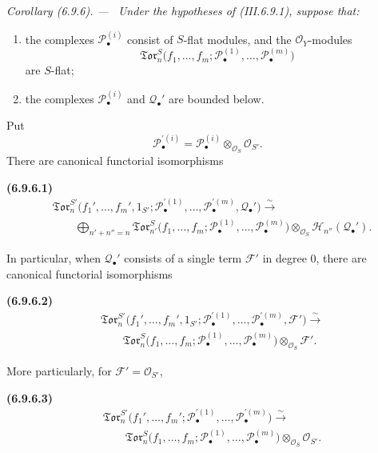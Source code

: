 \documentclass[10pt,oneside]{book}
\newcommand{\sh}[1]{\mathscr{#1}}
\newcommand{\sref}[2][]{(#2)}
\newcommand{\oldpage}[2][]{\setcounter{footnote}{0}\marginpar{\scriptsize\textbf{#1}~|~#2}\ignorespaces}
\newenvironment{env}[1][]{\par\medskip\noindent\textbf{(#1)}\ }{\par}
\newenvironment{corollary}[1][]{\par\medskip\noindent\itshape Corollary (#1). ---\ }{\par}
\begin{document}
\begin{corollary}[6.9.6]
\label{III.6.9.6}
Under the hypotheses of \sref{III.6.9.1}, suppose that:
\begin{enumerate}
  \item[$1^\circ$] the complexes $\sh P_\bullet^{(i)}$ consist of
  $S$-flat modules, and the $\sh O_Y$-modules
  \[
    \mathfrak{Tor}_n^S
    \bigl(
      f_1,\ldots,f_m;
      \sh P_\bullet^{(1)},\ldots,\sh P_\bullet^{(m)}
    \bigr)
  \]
  are $S$-flat;
  \item[$2^\circ$] the complexes $\sh P_\bullet^{(i)}$ and
  $\sh Q_\bullet'$ are bounded below.
\end{enumerate}

\oldpage[III]{169}

Put
\[
  \sh P_\bullet^{\prime(i)}
  =
  \sh P_\bullet^{(i)}
  \otimes_{\sh O_S}\sh O_{S'}.
\]
There are canonical functorial isomorphisms
\begin{env}[6.9.6.1]
\label{III.6.9.6.1}
\[
\begin{split}
  &
  \mathfrak{Tor}_n^{S'}
  \bigl(
    f_1',\ldots,f_m',1_{S'};
    \sh P_\bullet^{\prime(1)},\ldots,
    \sh P_\bullet^{\prime(m)},\sh Q_\bullet'
  \bigr)
  \xrightarrow{\sim}
  \\
  &\qquad
  \bigoplus_{n'+n''=n}
  \mathfrak{Tor}_{n'}^S
  \bigl(
    f_1,\ldots,f_m;
    \sh P_\bullet^{(1)},\ldots,\sh P_\bullet^{(m)}
  \bigr)
  \otimes_{\sh O_S}
  \sh H_{n''}(\sh Q_\bullet').
\end{split}
  \tag{6.9.6.1}\label{III.6.9.6.1.eq}
\]
\end{env}

In particular, when $\sh Q_\bullet'$ consists of a single term
$\sh F'$ in degree $0$, there are canonical functorial
isomorphisms
\begin{env}[6.9.6.2]
\label{III.6.9.6.2}
\[
\begin{split}
  &
  \mathfrak{Tor}_n^{S'}
  \bigl(
    f_1',\ldots,f_m',1_{S'};
    \sh P_\bullet^{\prime(1)},\ldots,
    \sh P_\bullet^{\prime(m)},\sh F'
  \bigr)
  \xrightarrow{\sim}
  \\
  &\qquad
  \mathfrak{Tor}_n^S
  \bigl(
    f_1,\ldots,f_m;
    \sh P_\bullet^{(1)},\ldots,\sh P_\bullet^{(m)}
  \bigr)
  \otimes_{\sh O_S}\sh F'.
\end{split}
  \tag{6.9.6.2}\label{III.6.9.6.2.eq}
\]
\end{env}
More particularly, for $\sh F'=\sh O_{S'}$,
\begin{env}[6.9.6.3]
\label{III.6.9.6.3}
\[
\begin{split}
  &
  \mathfrak{Tor}_n^{S'}
  \bigl(
    f_1',\ldots,f_m';
    \sh P_\bullet^{\prime(1)},\ldots,
    \sh P_\bullet^{\prime(m)}
  \bigr)
  \xrightarrow{\sim}
  \\
  &\qquad
  \mathfrak{Tor}_n^S
  \bigl(
    f_1,\ldots,f_m;
    \sh P_\bullet^{(1)},\ldots,\sh P_\bullet^{(m)}
  \bigr)
  \otimes_{\sh O_S}\sh O_{S'}.
\end{split}
  \tag{6.9.6.3}\label{III.6.9.6.3.eq}
\]
\end{env}
\end{corollary}
\end{document}

